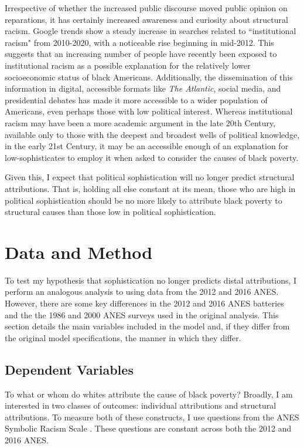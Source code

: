 \documentclass[12pt]{paper}
\begin{document}
Irrespective of whether the increased public discourse moved public opinion on reparations, it has certainly increased awareness and curiosity about structural racism. Google trends show a steady increase in searches related to ``institutional racism" from 2010-2020, with a noticeable rise beginning in mid-2012. This suggests that an increasing number of people have recently been exposed to institutional racism as a possible explanation for the relatively lower socioeconomic status of black Americans. Additionally, the dissemination of this information in digital, accessible formats like \textit{The Atlantic}, social media, and presidential debates has made it more accessible to a wider population of Americans, even perhaps those with low political interest. Whereas institutional racism may have been a more academic argument in the late 20th Century, available only to those with the deepest and broadest wells of political knowledge, in the early 21st Century, it may be an accessible enough of an explanation for low-sophisticates to employ it when asked to consider the causes of black poverty.

Given this, I expect that political sophistication will no longer predict structural attributions. That is, holding all else constant at its mean, those who are high in political sophistication should be no more likely to attribute black poverty to structural causes than those low in political sophistication.

\section{Data and Method}
To test my hypothesis that sophistication no longer predicts distal attributions, I perform an analogous analysis to \cite{gomez_rethinking_2006} using data from the 2012 and 2016 ANES. However, there are some key differences in the 2012 and 2016 ANES batteries and the the 1986 and 2000 ANES surveys used in the original analysis. This section details the main variables included in the model and, if they differ from the original model specifications, the manner in which they differ.

\subsection{Dependent Variables}
To what or whom do whites attribute the cause of black poverty? Broadly, I am interested in two classes of outcomes: individual attributions and structural attributions. To measure both of these constructs, I use questions from the ANES Symbolic Racism Scale \citep{kinder_divided_1997}. These questions are constant across both the 2012 and 2016 ANES.
\end{document}
